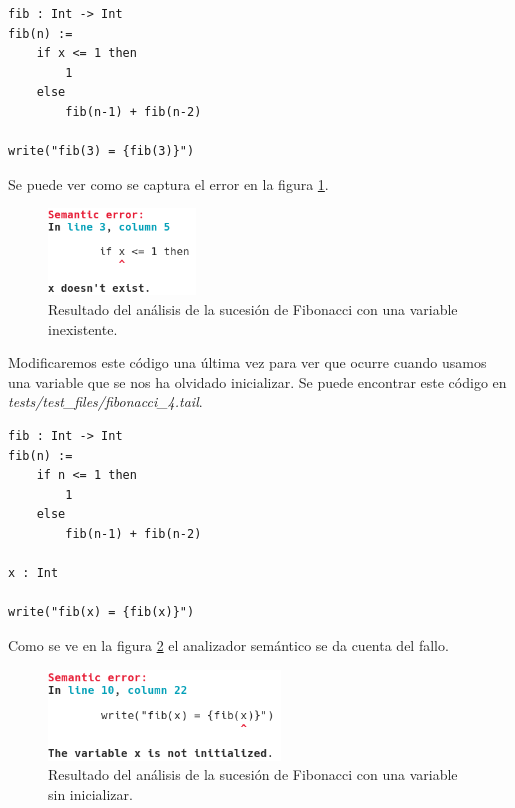 \begin{lstlisting}[style=tail]
fib : Int -> Int
fib(n) :=
	if x <= 1 then
		1
	else
		fib(n-1) + fib(n-2)

write("fib(3) = {fib(3)}")
\end{lstlisting}

Se puede ver como se captura el error en la figura \ref{fig:fib3}.\\

\begin{figure}[H]
	\begin{center}
		\includegraphics[width=0.35\textwidth]{imagenes/fib3.png}
		\caption{Resultado del análisis de la sucesión de Fibonacci con una variable inexistente.}
		\label{fig:fib3}
	\end{center}
\end{figure}

Modificaremos este código una última vez para ver que ocurre cuando usamos una variable que se nos ha olvidado inicializar. Se puede encontrar este código en \textit{tests/test\_files/fibonacci\_4.tail}.\\

\begin{lstlisting}[style=tail]
fib : Int -> Int
fib(n) :=
	if n <= 1 then
		1
	else
		fib(n-1) + fib(n-2)

x : Int

write("fib(x) = {fib(x)}")
\end{lstlisting}

Como se ve en la figura \ref{fig:fib4} el analizador semántico se da cuenta del fallo.\\

\begin{figure}[H]
	\begin{center}
		\includegraphics[width=0.55\textwidth]{imagenes/fib4.png}
		\caption{Resultado del análisis de la sucesión de Fibonacci con una variable sin inicializar.}
		\label{fig:fib4}
	\end{center}
\end{figure}

